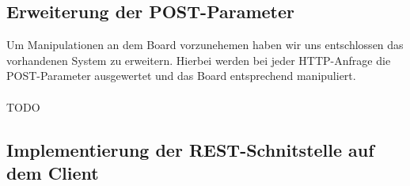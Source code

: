 
\subsection{Erweiterung der POST-Parameter}
Um Manipulationen an dem Board vorzunehemen haben wir uns entschlossen das
vorhandenen System zu erweitern. Hierbei werden bei jeder HTTP-Anfrage die
POST-Parameter ausgewertet und das Board entsprechend manipuliert.\\
\\
TODO

\subsection{Implementierung der REST-Schnitstelle auf dem Client}

